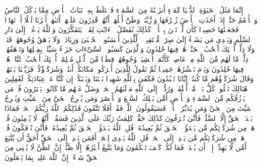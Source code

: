 إِنَّمَا مَثَلُ ٱلۡحَیَوٰةِ ٱلدُّنۡیَا كَمَاۤءٍ أَنزَلۡنَٰهُ مِنَ ٱلسَّمَاۤءِ فَٱخۡتَلَطَ بِهِۦ نَبَاتُ ٱلۡأَرۡضِ مِمَّا یَأۡكُلُ ٱلنَّاسُ وَٱلۡأَنۡعَٰمُ حَتَّىٰۤ إِذَاۤ أَخَذَتِ ٱلۡأَرۡضُ زُخۡرُفَهَا وَٱزَّیَّنَتۡ وَظَنَّ أَهۡلُهَاۤ أَنَّهُمۡ قَٰدِرُونَ عَلَیۡهَاۤ أَتَىٰهَاۤ أَمۡرُنَا لَیۡلًا أَوۡ نَهَارࣰا فَجَعَلۡنَٰهَا حَصِیدࣰا كَأَن لَّمۡ تَغۡنَ بِٱلۡأَمۡسِۚ كَذَٰلِكَ نُفَصِّلُ ٱلۡءَایَٰتِ لِقَوۡمࣲ یَتَفَكَّرُونَ%
\stopbuffer
\startbuffer[\q:10:25]
وَٱللَّهُ یَدۡعُوۤا۟ إِلَىٰ دَارِ ٱلسَّلَٰمِ وَیَهۡدِی مَن یَشَاۤءُ إِلَىٰ صِرَٰطࣲ مُّسۡتَقِیمࣲ%
\stopbuffer
\startbuffer[\q:10:26]
۞ لِّلَّذِینَ أَحۡسَنُوا۟ ٱلۡحُسۡنَىٰ وَزِیَادَةࣱۖ وَلَا یَرۡهَقُ وُجُوهَهُمۡ قَتَرࣱ وَلَا ذِلَّةٌۚ أُو۟لَٰۤئِكَ أَصۡحَٰبُ ٱلۡجَنَّةِۖ هُمۡ فِیهَا خَٰلِدُونَ%
\stopbuffer
\startbuffer[\q:10:27]
وَٱلَّذِینَ كَسَبُوا۟ ٱلسَّیِّءَاتِ جَزَاۤءُ سَیِّئَةِۭ بِمِثۡلِهَا وَتَرۡهَقُهُمۡ ذِلَّةࣱۖ مَّا لَهُم مِّنَ ٱللَّهِ مِنۡ عَاصِمࣲۖ كَأَنَّمَاۤ أُغۡشِیَتۡ وُجُوهُهُمۡ قِطَعࣰا مِّنَ ٱلَّیۡلِ مُظۡلِمًاۚ أُو۟لَٰۤئِكَ أَصۡحَٰبُ ٱلنَّارِۖ هُمۡ فِیهَا خَٰلِدُونَ%
\stopbuffer
\startbuffer[\q:10:28]
وَیَوۡمَ نَحۡشُرُهُمۡ جَمِیعࣰا ثُمَّ نَقُولُ لِلَّذِینَ أَشۡرَكُوا۟ مَكَانَكُمۡ أَنتُمۡ وَشُرَكَاۤؤُكُمۡۚ فَزَیَّلۡنَا بَیۡنَهُمۡۖ وَقَالَ شُرَكَاۤؤُهُم مَّا كُنتُمۡ إِیَّانَا تَعۡبُدُونَ%
\stopbuffer
\startbuffer[\q:10:29]
فَكَفَىٰ بِٱللَّهِ شَهِیدَۢا بَیۡنَنَا وَبَیۡنَكُمۡ إِن كُنَّا عَنۡ عِبَادَتِكُمۡ لَغَٰفِلِینَ%
\stopbuffer
\startbuffer[\q:10:30]
هُنَالِكَ تَبۡلُوا۟ كُلُّ نَفۡسࣲ مَّاۤ أَسۡلَفَتۡۚ وَرُدُّوۤا۟ إِلَى ٱللَّهِ مَوۡلَىٰهُمُ ٱلۡحَقِّۖ وَضَلَّ عَنۡهُم مَّا كَانُوا۟ یَفۡتَرُونَ%
\stopbuffer
\startbuffer[\q:10:31]
قُلۡ مَن یَرۡزُقُكُم مِّنَ ٱلسَّمَاۤءِ وَٱلۡأَرۡضِ أَمَّن یَمۡلِكُ ٱلسَّمۡعَ وَٱلۡأَبۡصَٰرَ وَمَن یُخۡرِجُ ٱلۡحَیَّ مِنَ ٱلۡمَیِّتِ وَیُخۡرِجُ ٱلۡمَیِّتَ مِنَ ٱلۡحَیِّ وَمَن یُدَبِّرُ ٱلۡأَمۡرَۚ فَسَیَقُولُونَ ٱللَّهُۚ فَقُلۡ أَفَلَا تَتَّقُونَ%
\stopbuffer
\startbuffer[\q:10:32]
فَذَٰلِكُمُ ٱللَّهُ رَبُّكُمُ ٱلۡحَقُّۖ فَمَاذَا بَعۡدَ ٱلۡحَقِّ إِلَّا ٱلضَّلَٰلُۖ فَأَنَّىٰ تُصۡرَفُونَ%
\stopbuffer
\startbuffer[\q:10:33]
كَذَٰلِكَ حَقَّتۡ كَلِمَتُ رَبِّكَ عَلَى ٱلَّذِینَ فَسَقُوۤا۟ أَنَّهُمۡ لَا یُؤۡمِنُونَ%
\stopbuffer
\startbuffer[\q:10:34]
قُلۡ هَلۡ مِن شُرَكَاۤئِكُم مَّن یَبۡدَؤُا۟ ٱلۡخَلۡقَ ثُمَّ یُعِیدُهُۥۚ قُلِ ٱللَّهُ یَبۡدَؤُا۟ ٱلۡخَلۡقَ ثُمَّ یُعِیدُهُۥۖ فَأَنَّىٰ تُؤۡفَكُونَ%
\stopbuffer
\startbuffer[\q:10:35]
قُلۡ هَلۡ مِن شُرَكَاۤئِكُم مَّن یَهۡدِیۤ إِلَى ٱلۡحَقِّۚ قُلِ ٱللَّهُ یَهۡدِی لِلۡحَقِّۗ أَفَمَن یَهۡدِیۤ إِلَى ٱلۡحَقِّ أَحَقُّ أَن یُتَّبَعَ أَمَّن لَّا یَهِدِّیۤ إِلَّاۤ أَن یُهۡدَىٰۖ فَمَا لَكُمۡ كَیۡفَ تَحۡكُمُونَ%
\stopbuffer
\startbuffer[\q:10:36]
وَمَا یَتَّبِعُ أَكۡثَرُهُمۡ إِلَّا ظَنًّاۚ إِنَّ ٱلظَّنَّ لَا یُغۡنِی مِنَ ٱلۡحَقِّ شَیۡءًاۚ إِنَّ ٱللَّهَ عَلِیمُۢ بِمَا یَفۡعَلُونَ%
\stopbuffer
